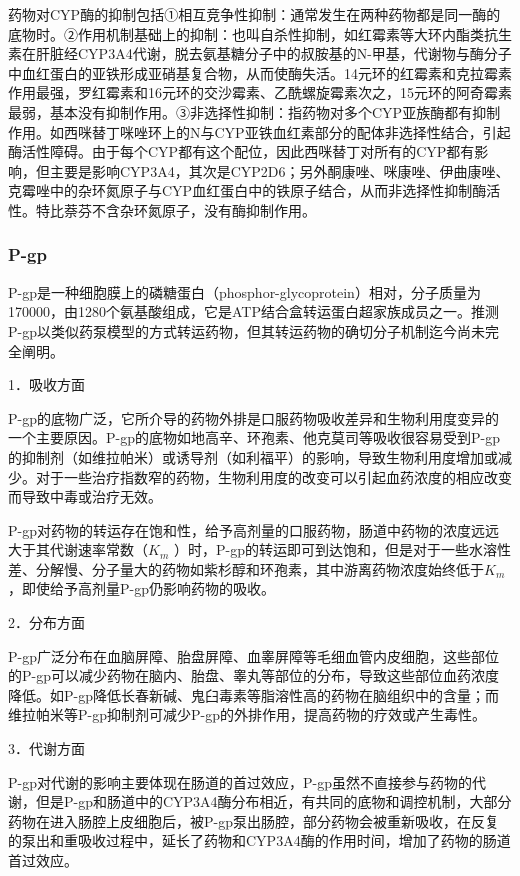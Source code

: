 药物对CYP酶的抑制包括①相互竞争性抑制：通常发生在两种药物都是同一酶的底物时。②作用机制基础上的抑制：也叫自杀性抑制，如红霉素等大环内酯类抗生素在肝脏经CYP3A4代谢，脱去氨基糖分子中的叔胺基的N-甲基，代谢物与酶分子中血红蛋白的亚铁形成亚硝基复合物，从而使酶失活。14元环的红霉素和克拉霉素作用最强，罗红霉素和16元环的交沙霉素、乙酰螺旋霉素次之，15元环的阿奇霉素最弱，基本没有抑制作用。③非选择性抑制：指药物对多个CYP亚族酶都有抑制作用。如西咪替丁咪唑环上的N与CYP亚铁血红素部分的配体非选择性结合，引起酶活性障碍。由于每个CYP都有这个配位，因此西咪替丁对所有的CYP都有影响，但主要是影响CYP3A4，其次是CYP2D6；另外酮康唑、咪康唑、伊曲康唑、克霉唑中的杂环氮原子与CYP血红蛋白中的铁原子结合，从而非选择性抑制酶活性。特比萘芬不含杂环氮原子，没有酶抑制作用。

\subsubsection{P-gp}

P-gp是一种细胞膜上的磷糖蛋白（phosphor-glycoprotein）相对，分子质量为170000，由1280个氨基酸组成，它是ATP结合盒转运蛋白超家族成员之一。推测P-gp以类似药泵模型的方式转运药物，但其转运药物的确切分子机制迄今尚未完全阐明。

1．吸收方面

P-gp的底物广泛，它所介导的药物外排是口服药物吸收差异和生物利用度变异的一个主要原因。P-gp的底物如地高辛、环孢素、他克莫司等吸收很容易受到P-gp的抑制剂（如维拉帕米）或诱导剂（如利福平）的影响，导致生物利用度增加或减少。对于一些治疗指数窄的药物，生物利用度的改变可以引起血药浓度的相应改变而导致中毒或治疗无效。

P-gp对药物的转运存在饱和性，给予高剂量的口服药物，肠道中药物的浓度远远大于其代谢速率常数（$K_m$
）时，P-gp的转运即可到达饱和，但是对于一些水溶性差、分解慢、分子量大的药物如紫杉醇和环孢素，其中游离药物浓度始终低于$K_m$ ，即使给予高剂量P-gp仍影响药物的吸收。

2．分布方面

P-gp广泛分布在血脑屏障、胎盘屏障、血睾屏障等毛细血管内皮细胞，这些部位的P-gp可以减少药物在脑内、胎盘、睾丸等部位的分布，导致这些部位血药浓度降低。如P-gp降低长春新碱、鬼臼毒素等脂溶性高的药物在脑组织中的含量；而维拉帕米等P-gp抑制剂可减少P-gp的外排作用，提高药物的疗效或产生毒性。

3．代谢方面

P-gp对代谢的影响主要体现在肠道的首过效应，P-gp虽然不直接参与药物的代谢，但是P-gp和肠道中的CYP3A4酶分布相近，有共同的底物和调控机制，大部分药物在进入肠腔上皮细胞后，被P-gp泵出肠腔，部分药物会被重新吸收，在反复的泵出和重吸收过程中，延长了药物和CYP3A4酶的作用时间，增加了药物的肠道首过效应。

